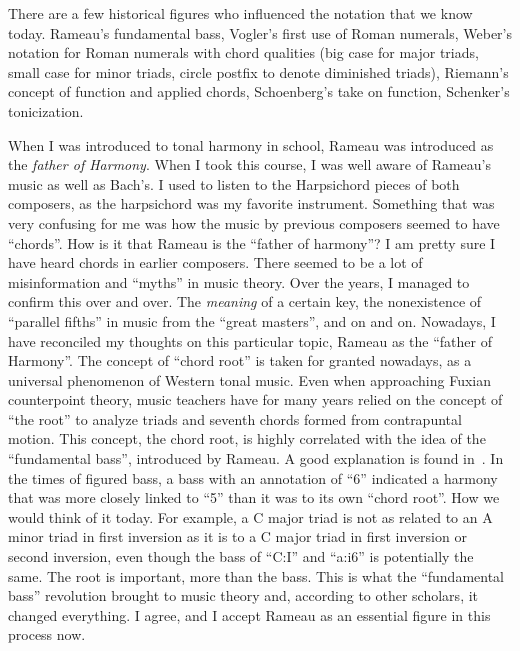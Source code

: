 There are a few historical figures who influenced the notation that we know today.
Rameau's fundamental bass, Vogler's first use of Roman numerals, Weber's notation for Roman numerals with chord qualities (big case for major triads, small case for minor triads, circle postfix to denote diminished triads), Riemann's concept of function and applied chords, Schoenberg's take on function, Schenker's tonicization.

When I was introduced to tonal harmony in school, Rameau was introduced as the \emph{father of Harmony}.
When I took this course, I was well aware of Rameau's music as well as Bach's.
I used to listen to the Harpsichord pieces of both composers, as the harpsichord was my favorite instrument.
Something that was very confusing for me was how the music by previous composers seemed to have ``chords''.
How is it that Rameau is the ``father of harmony''? I am pretty sure I have heard chords in earlier composers.
There seemed to be a lot of misinformation and ``myths'' in music theory.
Over the years, I managed to confirm this over and over.
The \emph{meaning} of a certain key, the nonexistence of ``parallel fifths'' in music from the ``great masters'', and on and on.
Nowadays, I have reconciled my thoughts on this particular topic, Rameau as the ``father of Harmony''.
The concept of ``chord root'' is taken for granted nowadays, as a universal phenomenon of Western tonal music.
Even when approaching Fuxian counterpoint theory, music teachers have for many years relied on the concept of ``the root'' to analyze triads and seventh chords formed from contrapuntal motion.
This concept, the chord root, is highly correlated with the idea of the ``fundamental bass'', introduced by Rameau.
A good explanation is found in~\textcite{christensen_rameau_2002}.
In the times of figured bass, a bass with an annotation of ``6'' indicated a harmony that was more closely linked to ``5'' than it was to its own ``chord root''.
How we would think of it today.
For example, a C major triad is not as related to an A minor triad in first inversion as it is to a C major triad in first inversion or second inversion, even though the bass of ``C:I'' and ``a:i6'' is potentially the same.
The root is important, more than the bass.
This is what the ``fundamental bass'' revolution brought to music theory and, according to other scholars, it changed everything.
I agree, and I accept Rameau as an essential figure in this process now.


